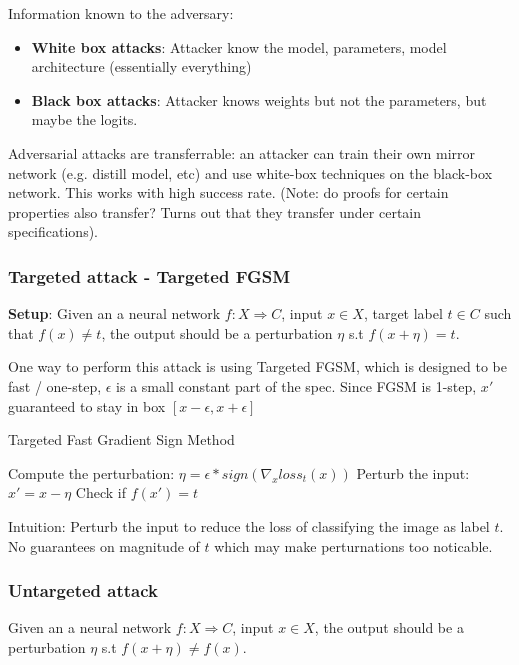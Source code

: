 \documentclass[11pt]{article}
\begin{document}
Information known to the adversary:
\begin{itemize}
	\item \textbf{White box attacks}: Attacker know the model, parameters, model architecture (essentially everything)
	\item \textbf{Black box attacks}: Attacker knows weights but not the parameters, but maybe the logits.  
\end{itemize}
Adversarial attacks are transferrable: an attacker can train their own mirror network (e.g. distill model, etc) and use white-box techniques on the black-box network. This works with high success rate. (Note: do proofs for certain properties also transfer? Turns out that they transfer under certain specifications).


\subsubsection{Targeted attack - Targeted FGSM}
\textbf{Setup}: Given an a neural network $f: X \Rightarrow C$, input $x \in X$, target label $t \in C$ such that $f(x) \neq t$, the output should be a perturbation $\eta$ s.t $f(x + \eta) = t$.

One way to perform this attack is using Targeted FGSM, which is designed to be fast / one-step, $\epsilon$ is a small constant part of the spec. Since FGSM is 1-step, $x'$ guaranteed to stay in box $[x - \epsilon, x + \epsilon]$

\begin{algorithm}
\caption{Targeted Fast Gradient Sign Method}
\begin{algorithmic}[1]
\State Compute the perturbation: $\eta = \epsilon * sign(\nabla_x loss_t(x))$
\State Perturb the input: $x' = x - \eta$
\State Check if $f(x') = t$ 
\end{algorithmic}
\end{algorithm}

\begin{note}
	Intuition: Perturb the input to reduce the loss of classifying the image as label $t$. No guarantees on magnitude of $t$ which may make perturnations too noticable.
\end{note}

\subsubsection{Untargeted attack}
Given an a neural network $f: X \Rightarrow C$, input $x \in X$, the output should be a perturbation $\eta$ s.t $f(x + \eta) \neq f(x)$.
\end{document}
